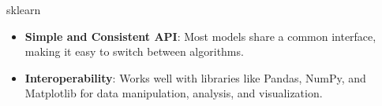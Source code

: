 \begin{notes}{sklearn}
    \begin{highlight}
        \begin{itemize}
            \item \textbf{Simple and Consistent API}: Most models share a common interface, making it easy to switch between algorithms.
            \item \textbf{Interoperability}: Works well with libraries like Pandas, NumPy, and Matplotlib for data manipulation, analysis, and visualization.
        \end{itemize}
    \end{highlight}
\end{notes}